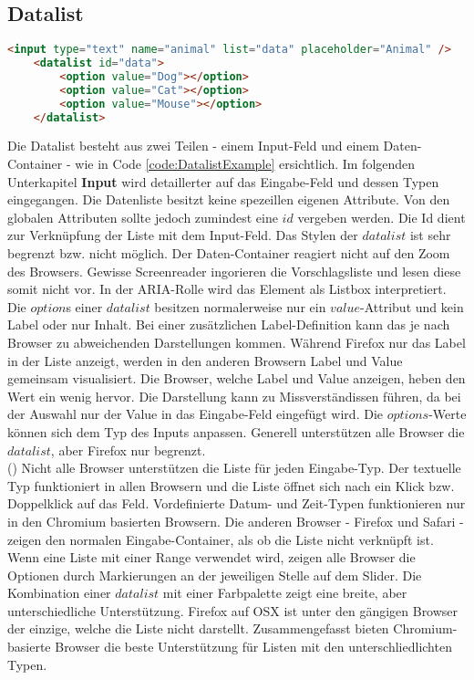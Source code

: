\subsection{Datalist}

\begin{lstlisting}[language = html, caption = Code: Datalist Example, label = code:DatalistExample]
    <input type="text" name="animal" list="data" placeholder="Animal" />
    <datalist id="data">
        <option value="Dog"></option>
        <option value="Cat"></option>
        <option value="Mouse"></option>
    </datalist>
\end{lstlisting}

Die Datalist besteht aus zwei Teilen - einem Input-Feld und einem Daten-Container - wie in Code \ref{code:DatalistExample} ersichtlich. 
Im folgenden Unterkapitel \textbf{Input} wird detaillerter auf das Eingabe-Feld und dessen Typen eingegangen.
Die Datenliste besitzt keine spezeillen eigenen Attribute.
Von den globalen Attributen sollte jedoch zumindest eine $id$ vergeben werden.
Die Id dient zur Verknüpfung der Liste mit dem Input-Feld. 
Das Stylen der $datalist$ ist sehr begrenzt bzw. nicht möglich. 
Der Daten-Container reagiert nicht auf den Zoom des Browsers.
Gewisse Screenreader ingorieren die Vorschlagsliste und lesen diese somit nicht vor.
In der ARIA-Rolle wird das Element als Listbox interpretiert.
\\
Die $option$s einer $datalist$ besitzen normalerweise nur ein $value$-Attribut und kein Label oder nur Inhalt.
Bei einer zusätzlichen Label-Definition kann das je nach Browser zu abweichenden Darstellungen kommen. 
Während Firefox nur das Label in der Liste anzeigt, werden in den anderen Browsern Label und Value gemeinsam visualisiert. 
Die Browser, welche Label und Value anzeigen, heben den Wert ein wenig hervor.
Die Darstellung kann zu Missverständissen führen, da bei der Auswahl nur der Value in das Eingabe-Feld eingefügt wird. 
Die $options$-Werte können sich dem Typ des Inputs anpassen. 
Generell unterstützen alle Browser die $datalist$, aber Firefox nur begrenzt.
\\
(\cite{optionMdn}) Nicht alle Browser unterstützen die Liste für jeden Eingabe-Typ.
Der textuelle Typ funktioniert in allen Browsern und die Liste öffnet sich nach ein Klick bzw. Doppelklick auf das Feld.
Vordefinierte Datum- und Zeit-Typen funktionieren nur in den Chromium basierten Browsern. 
Die anderen Browser - Firefox und Safari - zeigen den normalen Eingabe-Container, als ob die Liste nicht verknüpft ist.
Wenn eine Liste mit einer Range verwendet wird, zeigen alle Browser die Optionen durch Markierungen an der jeweiligen Stelle auf dem Slider.
Die Kombination einer $datalist$ mit einer Farbpalette zeigt eine breite, aber unterschiedliche Unterstützung. 
Firefox auf OSX ist unter den gängigen Browser der einzige, welche die Liste nicht darstellt.
Zusammengefasst bieten Chromium-basierte Browser die beste Unterstützung für Listen mit den unterschliedlichten Typen.


